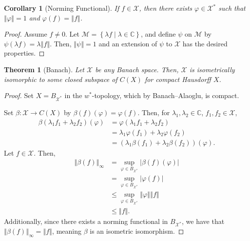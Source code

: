 \documentclass[12pt]{extarticle}
\newcommand{\C}{\mathbb{C}}
\newcommand{\norm}[1]{\left\Vert #1\right\Vert}
\newcommand{\set}[1]{\left\{#1\right\}}
\theoremstyle{plain}
\newtheorem*{theorem}{Theorem}
\newtheorem*{corollary}{Corollary}
\theoremstyle{definition}
\theoremstyle{note}
\renewcommand{\newline}{\hfill\break}
\begin{document}
\begin{corollary}[Norming Functional]
  If $f\in \mathcal{X}$, then there exists $\varphi \in \mathcal{X}^{\ast}$ such that $\norm{\varphi} = 1$ and $\varphi(f) = \norm{f}$.
\end{corollary}
\begin{proof}
  Assume $f\neq 0$. Let $\mathcal{M} = \set{\lambda f\mid \lambda \in \C}$, and define $\psi$ on $\mathcal{M}$ by $\psi(\lambda f) = \lambda \norm{f}$. Then, $\norm{\psi} = 1$ and an extension of $\psi$ to $\mathcal{X}$ has the desired properties.
\end{proof}
\begin{theorem}[Banach]
  Let $\mathcal{X}$ be any Banach space. Then, $\mathcal{X}$ is isometrically isomorphic to some closed subspace of $C(X)$ for compact Hausdorff $X$.
\end{theorem}
\begin{proof}
  Set $X = B_{\mathcal{X}^{\ast}}$ in the $w^{\ast}$-topology, which by Banach--Alaoglu, is compact.\newline

  Set $\beta: \mathcal{X}\rightarrow C(X)$ by $\beta(f)(\varphi) = \varphi(f)$. Then, for $\lambda_1,\lambda_2\in \C$, $f_1,f_2\in \mathcal{X}$,
  \begin{align*}
    \beta\left(\lambda_1f_1 + \lambda_2f_2\right)(\varphi) &= \varphi\left(\lambda_1 f_1 + \lambda_2f_2\right)\\
                                                           &= \lambda_1 \varphi(f_1) + \lambda_2\varphi\left(f_2\right)\\
                                                           &= \left(\lambda_1\beta\left(f_1\right) + \lambda_2\beta\left(f_2\right)\right)\left(\varphi\right).
  \end{align*}
  Let $f\in \mathcal{X}$. Then,
  \begin{align*}
    \norm{\beta(f)}_{\infty} &= \sup_{\varphi \in B_{\mathcal{X}^{\ast}}} \left\vert \beta(f)(\varphi) \right\vert\\
                             &= \sup_{\varphi \in B_{\mathcal{X}^{\ast}}}\left\vert \varphi(f) \right\vert\\
                             &\leq \sup_{\varphi \in B_{\mathcal{X}^{\ast}}}\norm{\varphi}\norm{f}\\
                             &\leq \norm{f}.
  \end{align*}
  Additionally, since there exists a norming functional in $B_{\mathcal{X}^{\ast}}$, we have that $\norm{\beta(f)}_{\infty} = \norm{f}$, meaning $\beta$ is an isometric isomorphism.
\end{proof}
\end{document}
